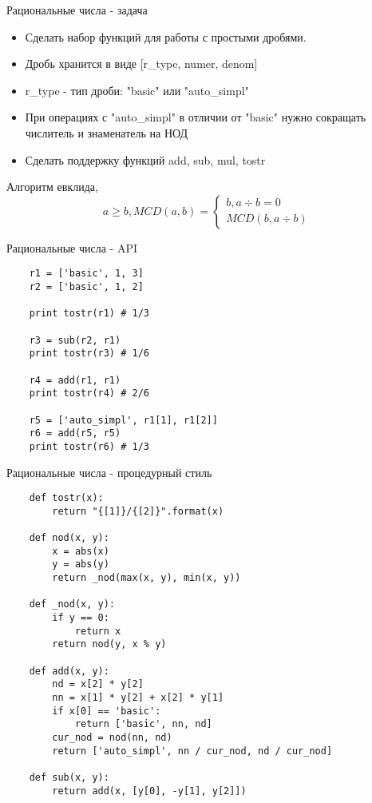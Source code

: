 \documentclass{article}
\begin{document}
\LARGE

\begin{center} Рациональные числа - задача \end{center}
\begin{itemize}
    \item Сделать набор функций для работы с простыми дробями.
    \item Дробь хранится в виде [r\_type, numer, denom]
    \item r\_type - тип дроби: "basic" или "auto\_simpl"
    \item При операциях с "auto\_simpl" в отличии от "basic" нужно
          сокращать числитель и знаменатель на НОД
    \item Сделать поддержку функций add, sub, mul, tostr
\end{itemize}
Алгоритм евклида, 
$$
    a \geq b, MCD(a, b) = \left\{ 
    \begin{array}{r}
        b,  a \div b = 0 \\
        MCD(b, a \div b)
    \end{array} \right.
$$

\newpage

\begin{center} Рациональные числа - API \end{center}
\begin{lstlisting}
    r1 = ['basic', 1, 3]
    r2 = ['basic', 1, 2]

    print tostr(r1) # 1/3

    r3 = sub(r2, r1)
    print tostr(r3) # 1/6

    r4 = add(r1, r1)
    print tostr(r4) # 2/6

    r5 = ['auto_simpl', r1[1], r1[2]]
    r6 = add(r5, r5)
    print tostr(r6) # 1/3
\end{lstlisting}
\newpage

\begin{center}Рациональные числа - процедурный стиль\end{center}
\begin{lstlisting}
    def tostr(x):
        return "{[1]}/{[2]}".format(x)

    def nod(x, y):
        x = abs(x)
        y = abs(y)
        return _nod(max(x, y), min(x, y))

    def _nod(x, y):
        if y == 0:
            return x
        return nod(y, x % y)

    def add(x, y):
        nd = x[2] * y[2]
        nn = x[1] * y[2] + x[2] * y[1]
        if x[0] == 'basic':
            return ['basic', nn, nd]
        cur_nod = nod(nn, nd)
        return ['auto_simpl', nn / cur_nod, nd / cur_nod]

    def sub(x, y):
        return add(x, [y[0], -y[1], y[2]])
\end{lstlisting}
\newpage
\end{document}
